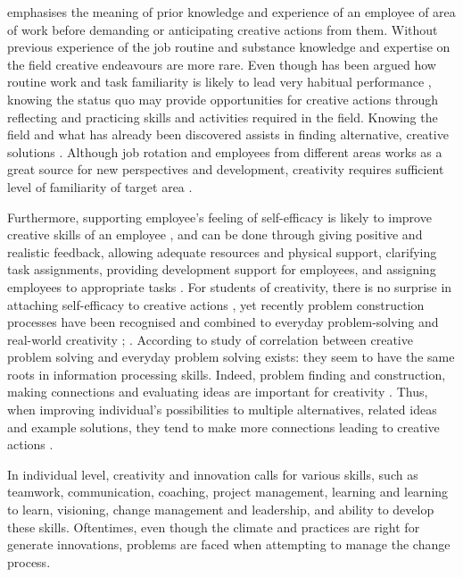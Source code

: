 \citet{shalley2004leaders} emphasises the meaning of prior knowledge and experience of an employee of area of work before demanding or anticipating creative actions from them. Without previous experience of the job routine and substance knowledge and expertise on the field creative endeavours are more rare. Even though has been argued how routine work and task familiarity is likely to lead very habitual performance \citep{ford1996theory}, knowing the status quo may provide opportunities for creative actions through reflecting and practicing skills and activities required in the field. \citep{shalley2004leaders} Knowing the field and what has already been discovered assists in finding alternative, creative solutions \citep{andriopoulos2000enhancing}. Although job rotation and employees from different areas works as a great source for new perspectives and development, creativity requires sufficient level of familiarity of target area \citep{shalley2004leaders}.

Furthermore, supporting employee's feeling of self-efficacy is likely to improve creative skills of an employee \citep{redmond1993putting}, and can be done through giving positive and realistic feedback, allowing adequate resources and physical support, clarifying task assignments, providing development support for employees, and assigning employees to appropriate tasks \citep{hennessey19881}. For students of creativity, there is no surprise in attaching self-efficacy to creative actions \citep{mumford1988creativity}, yet recently problem construction processes have been recognised and combined to everyday problem-solving and real-world creativity \citep{getzels1975problem}; \citep{runco1988problem}. According to study of  \citep{gardner1988creativity} correlation between creative problem solving and everyday problem solving exists: they seem to have the same roots in information processing skills.  Indeed, problem finding and construction, making connections and evaluating ideas are important for creativity \citep{mumford2002leading,vincent2002divergent}. Thus, when improving individual's possibilities to multiple alternatives, related ideas and example solutions, they tend to make more connections leading to creative actions \citep{amabile1996assessing}. 

In individual level, creativity and innovation calls for various skills, such as teamwork, communication, coaching, project management, learning and learning to learn, visioning, change management and leadership, and ability to develop these skills. Oftentimes, even though the climate and practices are right for generate innovations, problems are faced when attempting to manage the change process. \citep{roffe1999innovation}

